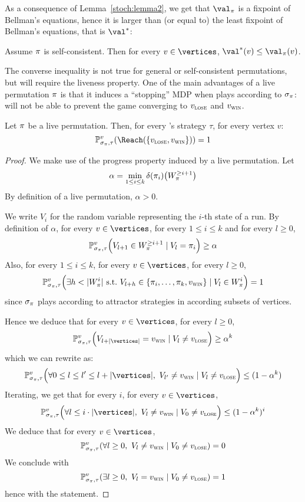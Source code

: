 As a consequence of Lemma~\ref{stoch:lemma2}, we get that $\val_\perm$
is a fixpoint of Bellman's equations, hence it is larger than (or
equal to) the least fixpoint of Bellman's equations, that is $\val^*$:

\begin{corollary}
  Assume $\pi$ is self-consistent.  Then for every $v \in
  \vertices$, $\val^*(v) \le \val_\perm(v)$.
\end{corollary}

The converse inequality is not true for general or self-consistent
permutations, but will require the liveness property. One of the main
advantages of a live permutation $\pi$ is that it induces a
``stopping'' MDP when \Eve plays according to $\sigma_\pi$: \Adam
will not be able to prevent the game converging to $v_{\textsc{lose}}$ and $v_{\textsc{win}}$.

\begin{lemma}
  \label{stoch:lemma:stopping}
  Let $\pi$ be a live permutation. Then, for every \Adam's strategy
  $\tau$, for every vertex $v$:
  \[
  \probm^v_{\sigma_\perm,\tau} (\Reach(\{\vlose,\vwin\})) = 1
  \]
\end{lemma}

\begin{proof}
  We make use of the progress property induced by a live permutation.
  Let
  \[
  \alpha = \min_{1 \le i \le k} \delta(\pi_i) \big(W_\pi^{\ge
    i+1}\big)
  \]
  By definition of a live permutation, $\alpha>0$.

  We write $V_i$ for the random variable representing the $i$-th state
  of a run.
  By definition of $\alpha$, for every $v \in \vertices$, for every $1
  \le i \le k$ and for every $l \ge 0$,
  \[
  \mathbb{P}^v_{\sigma_\pi,\tau}\Big(V_{l+1} \in W_\pi^{\ge i+1} \mid
  V_l = \pi_i\Big) \ge \alpha
  \]
  Also, for every $1 \le i \le k$, for every $v \in \vertices$, for
  every $l \ge 0$,
  \[
  \mathbb{P}^v_{\sigma_\pi,\tau}\Big(\exists h < |W_\pi^i|\
  \text{s.t.}\ V_{l+h} \in \{\pi_i,\ldots,\pi_k,v_{\textsc{win}}\} \mid V_l
  \in W_\pi^i\Big)=1
  \]
  since $\sigma_\pi$ plays according to attractor strategies in
  according subsets of vertices.

  Hence we deduce that for every $v \in \vertices$, for every $l \ge
  0$,
  \[
  \probm^v_{\sigma_\perm,\tau}\Big(V_{l+|\vertices|}=\vwin \mid V_l
  \ne \vlose\Big) \ge \alpha^k
  \]
  which we can rewrite as:
  \[
  \probm^v_{\sigma_\perm,\tau}\Big(\forall 0 \le l \le l' \le
  l+|\vertices|,\ V_{l'} \ne \vwin \mid V_l \ne \vlose\Big) \le
  (1-\alpha^k)
  \]
  Iterating, we get that for every $i$, for every $v \in \vertices$,
  \[
  \probm^v_{\sigma_\perm,\tau}\Big(\forall l \le i \cdot |\vertices|,\
  V_{l} \ne \vwin \mid V_0 \ne \vlose\Big) \le (1-\alpha^k)^i
  \]
  We  deduce that for every $v \in \vertices$,
  \[
  \probm^v_{\sigma_\perm,\tau}(\forall l \ge 0,\ V_l \ne \vwin \mid
  V_0 \ne \vlose) = 0
  \]
  We conclude with
  \[
  \probm^v_{\sigma_\perm,\tau}(\exists l \ge 0,\ V_l = \vwin \mid V_0
  \ne \vlose) = 1
  \]
  hence with the statement.
\end{proof}


